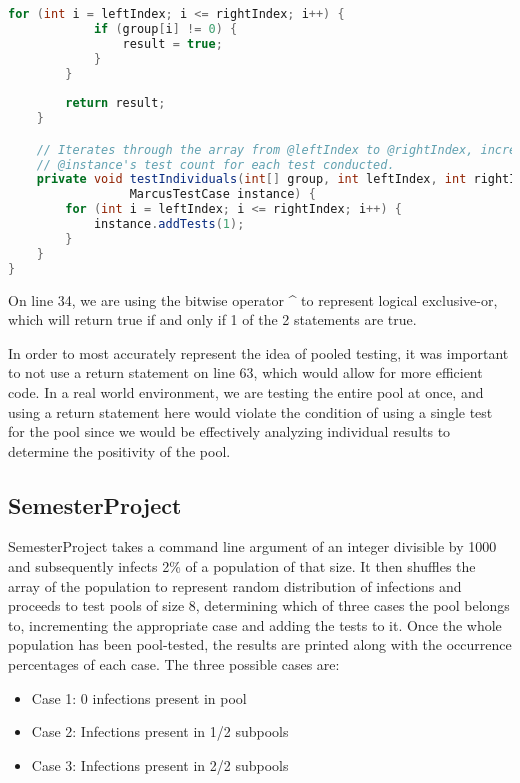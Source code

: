 \documentclass[letterpaper, 10pt]{article}
\begin{document}
\begin{lstlisting}[language=Java, firstnumber=1]
        for (int i = leftIndex; i <= rightIndex; i++) {
            if (group[i] != 0) {
                result = true;
            }
        }
        
        return result;
    }

    // Iterates through the array from @leftIndex to @rightIndex, incrementing
    // @instance's test count for each test conducted.
    private void testIndividuals(int[] group, int leftIndex, int rightIndex,
                 MarcusTestCase instance) {
        for (int i = leftIndex; i <= rightIndex; i++) {
            instance.addTests(1);
        }
    }
}

\end{lstlisting}

\hspace{1.0em}On line 34, we are using the bitwise operator \^{} to represent logical exclusive-or, which will return true if and only if 1 of the 2 statements are true.

\hspace{1.0em}In order to most accurately represent the idea of pooled testing, it was important to not use a return statement on line 63, which would allow for more efficient code. In a real world environment, we are testing the entire pool at once, and using a return statement here would violate the condition of using a single test for the pool since we would be effectively analyzing individual results to determine the positivity of the pool.

\subsection{SemesterProject}

\hspace{1.0em}SemesterProject takes a command line argument of an integer divisible by 1000 and subsequently infects 2\% of a population of that size. It then shuffles the array of the population to represent random distribution of infections and proceeds to test pools of size 8, determining which of three cases the pool belongs to, incrementing the appropriate case and adding the tests to it. Once the whole population has been pool-tested, the results are printed along with the occurrence percentages of each case.
\hspace{1.0em}The three possible cases are:

\begin{itemize}
    \item Case 1: 0 infections present in pool
    \item Case 2: Infections present in 1/2 subpools
    \item Case 3: Infections present in 2/2 subpools
\end{itemize}
\end{document}
